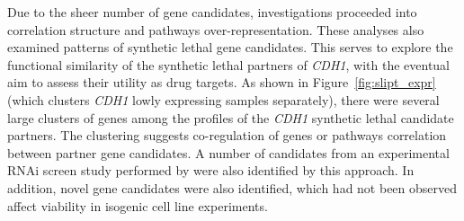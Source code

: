 Due to the sheer number of gene candidates, investigations proceeded into correlation structure and \glspl{pathway} over-represent\-ation. These analyses also examined  patterns of \gls{synthetic lethal} gene candidates. This serves to explore the functional similarity of the \gls{synthetic lethal} partners of \textit{CDH1}, with the eventual aim to assess their utility as drug targets. As shown in Figure~\ref{fig:slipt_expr} (which clusters \textit{CDH1} lowly expressing samples separately), there were several large clusters of genes among the   profiles of the \textit{CDH1} \gls{synthetic lethal} candidate partners. The clustering suggests co-regulation of genes or \glspl{pathway} correlation between partner gene candidates. A number of candidates from an experimental \gls{RNAi} screen study performed by \citet{Telford2015} were also identified by this approach. In addition, novel gene candidates were also identified, which had not been observed affect viability in isogenic cell line experiments. %

